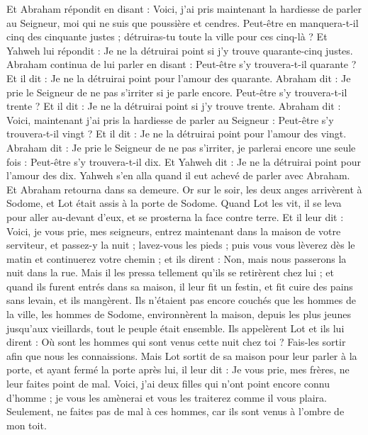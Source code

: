 \begin{multicols}{2}
Et Abraham répondit en disant : Voici, j'ai pris maintenant la hardiesse de parler au Seigneur, moi qui ne suis que poussière et cendres.
Peut-être en manquera-t-il cinq des cinquante justes ; détruiras-tu toute la ville pour ces cinq-là ? Et Yahweh lui répondit : Je ne la détruirai point si j'y trouve quarante-cinq justes.
Abraham continua de lui parler en disant : Peut-être s'y trouvera-t-il quarante ? Et il dit : Je ne la détruirai point pour l'amour des quarante.
Abraham dit : Je prie le Seigneur de ne pas s'irriter si je parle encore. Peut-être s'y trouvera-t-il trente ? Et il dit : Je ne la détruirai point si j'y trouve trente.
Abraham dit : Voici, maintenant j'ai pris la hardiesse de parler au Seigneur : Peut-être s'y trouvera-t-il vingt ? Et il dit : Je ne la détruirai point pour l'amour des vingt.
Abraham dit : Je prie le Seigneur de ne pas s'irriter, je parlerai encore une seule fois : Peut-être s'y trouvera-t-il dix. Et Yahweh dit : Je ne la détruirai point pour l'amour des dix.
Yahweh s'en alla quand il eut achevé de parler avec Abraham. Et Abraham retourna dans sa demeure.
\VerseOne{}Or sur le soir, les deux anges arrivèrent à Sodome, et Lot était assis à la porte de Sodome. Quand Lot les vit, il se leva pour aller au-devant d'eux, et se prosterna la face contre terre.
Et il leur dit : Voici, je vous prie, mes seigneurs, entrez maintenant dans la maison de votre serviteur, et passez-y la nuit ; lavez-vous les pieds ; puis vous vous lèverez dès le matin et continuerez votre chemin ; et ils dirent : Non, mais nous passerons la nuit dans la rue.
Mais il les pressa tellement qu'ils se retirèrent chez lui ; et quand ils furent entrés dans sa maison, il leur fit un festin, et fit cuire des pains sans levain, et ils mangèrent.
Ils n'étaient pas encore couchés que les hommes de la ville, les hommes de Sodome, environnèrent la maison, depuis les plus jeunes jusqu'aux vieillards, tout le peuple était ensemble.
Ils appelèrent Lot et ils lui dirent : Où sont les hommes qui sont venus cette nuit chez toi ? Fais-les sortir afin que nous les connaissions.
Mais Lot sortit de sa maison pour leur parler à la porte, et ayant fermé la porte après lui,
il leur dit : Je vous prie, mes frères, ne leur faites point de mal.
Voici, j'ai deux filles qui n'ont point encore connu d'homme ; je vous les amènerai et vous les traiterez comme il vous plaira. Seulement, ne faites pas de mal à ces hommes, car ils sont venus à l'ombre de mon toit.

\end{multicols}
